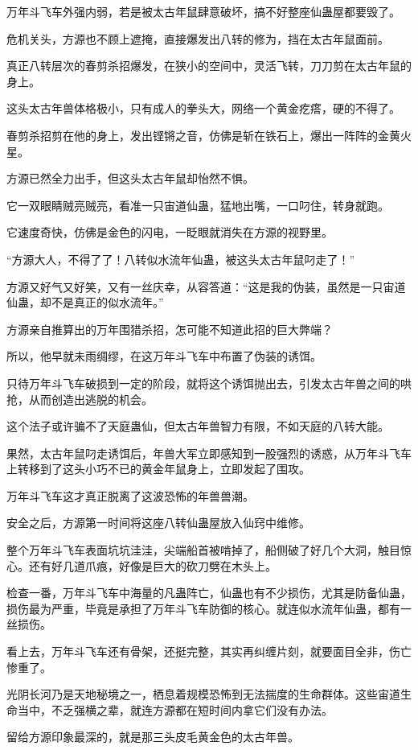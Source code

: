 \begin{this_body}
万年斗飞车外强内弱，若是被太古年鼠肆意破坏，搞不好整座仙蛊屋都要毁了。

危机关头，方源也不顾上遮掩，直接爆发出八转的修为，挡在太古年鼠面前。

真正八转层次的春剪杀招爆发，在狭小的空间中，灵活飞转，刀刀剪在太古年鼠的身上。

这头太古年兽体格极小，只有成人的拳头大，网络一个黄金疙瘩，硬的不得了。

春剪杀招剪在他的身上，发出铿锵之音，仿佛是斩在铁石上，爆出一阵阵的金黄火星。

方源已然全力出手，但这头太古年鼠却怡然不惧。

它一双眼睛贼亮贼亮，看准一只宙道仙蛊，猛地出嘴，一口叼住，转身就跑。

它速度奇快，仿佛是金色的闪电，一眨眼就消失在方源的视野里。

“方源大人，不得了了！八转似水流年仙蛊，被这头太古年鼠叼走了！”

方源又好气又好笑，又有一丝庆幸，从容答道：“这是我的伪装，虽然是一只宙道仙蛊，却不是真正的似水流年。”

方源亲自推算出的万年围猎杀招，怎可能不知道此招的巨大弊端？

所以，他早就未雨绸缪，在这万年斗飞车中布置了伪装的诱饵。

只待万年斗飞车破损到一定的阶段，就将这个诱饵抛出去，引发太古年兽之间的哄抢，从而创造出逃脱的机会。

这个法子或许骗不了天庭蛊仙，但太古年兽智力有限，不如天庭的八转大能。

果然，太古年鼠叼走诱饵后，年兽大军立即感知到一股强烈的诱惑，从万年斗飞车上转移到了这头小巧不已的黄金年鼠身上，立即发起了围攻。

万年斗飞车这才真正脱离了这波恐怖的年兽兽潮。

安全之后，方源第一时间将这座八转仙蛊屋放入仙窍中维修。

整个万年斗飞车表面坑坑洼洼，尖端船首被啃掉了，船侧破了好几个大洞，触目惊心。还有好几道爪痕，好像是巨大的砍刀劈在木头上。

检查一番，万年斗飞车中海量的凡蛊阵亡，仙蛊也有不少损伤，尤其是防备仙蛊，损伤最为严重，毕竟是承担了万年斗飞车防御的核心。就连似水流年仙蛊，都有一丝损伤。

看上去，万年斗飞车还有骨架，还挺完整，其实再纠缠片刻，就要面目全非，伤亡惨重了。

光阴长河乃是天地秘境之一，栖息着规模恐怖到无法揣度的生命群体。这些宙道生命当中，不乏强横之辈，就连方源都在短时间内拿它们没有办法。

留给方源印象最深的，就是那三头皮毛黄金色的太古年兽。


\end{this_body}
